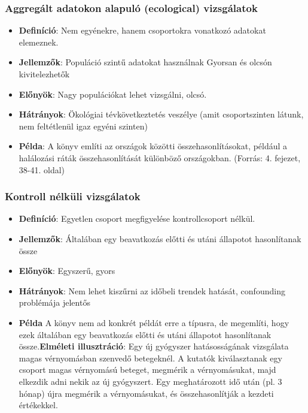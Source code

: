 \documentclass[a4paper,12pt]{article}
\begin{document}
\subsubsection{Aggregált adatokon alapuló (ecological) vizsgálatok}

\begin{itemize}

\item  \textbf{Definíció}: Nem egyénekre, hanem csoportokra vonatkozó adatokat elemeznek.

\item \textbf{Jellemzők}:
Populáció szintű adatokat használnak
Gyorsan és olcsón kivitelezhetők

\item \textbf{Előnyök}: Nagy populációkat lehet vizsgálni, olcsó.

\item \textbf{Hátrányok}: Ökológiai tévkövetkeztetés veszélye (amit csoportszinten látunk, nem feltétlenül igaz egyéni szinten)

\item \textbf{Példa}: A könyv említi az országok közötti összehasonlításokat, például a halálozási ráták összehasonlítását különböző országokban. (Forrás: 4. fejezet, 38-41. oldal)


\end{itemize}


\subsubsection{Kontroll nélküli vizsgálatok}
    
\begin{itemize}

\item \textbf{Definíció}: Egyetlen csoport megfigyelése kontrollcsoport nélkül.

\item \textbf{Jellemzők}:
Általában egy beavatkozás előtti és utáni állapotot hasonlítanak össze

\item \textbf{Előnyök}: Egyszerű, gyors

\item \textbf{Hátrányok}: Nem lehet kiszűrni az időbeli trendek hatását, confounding problémája jelentős

\item \textbf{Példa} 
A könyv nem ad konkrét példát erre a típusra, de megemlíti, hogy ezek általában egy beavatkozás előtti és utáni állapotot hasonlítanak össze.\textbf{Elméleti illusztráció}: Egy új gyógyszer hatásosságának vizsgálata magas vérnyomásban szenvedő betegeknél. A kutatók kiválasztanak egy csoport magas vérnyomású beteget, megmérik a vérnyomásukat, majd elkezdik adni nekik az új gyógyszert. Egy meghatározott idő után (pl. 3 hónap) újra megmérik a vérnyomásukat, és összehasonlítják a kezdeti értékekkel.

\end{itemize}
\end{document}
